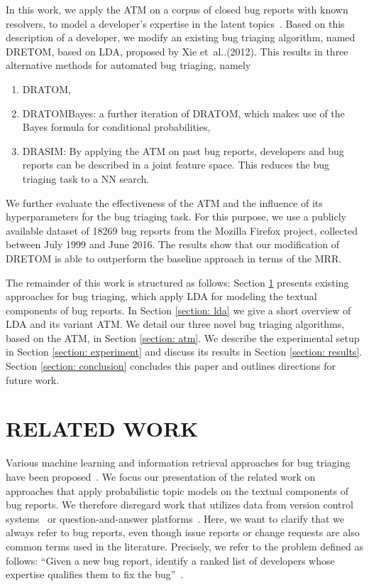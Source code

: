 \documentclass[a4paper,twoside]{article}
\makeatletter
\DeclareRobustCommand\onedot{\futurelet\@let@token\@onedot}
\def\@onedot{\ifx\@let@token.\else.\null\fi\xspace}
\def\etal{et~al\onedot}
\makeatother
\begin{document}
In this work, we apply the \ac{ATM} on a corpus of closed bug reports with known resolvers, to model a developer's expertise in the latent topics~\cite{rosen-zvi2004authors}.
Based on this description of a developer, we modify an existing bug triaging algorithm, named \ac{DRETOM}, based on \ac{LDA}, proposed by Xie \etal (2012).
This results in three alternative methods for automated bug triaging, namely
\begin{enumerate}
    \item \ac{DRATOM},
    \item \ac{DRATOMBayes}: a further iteration of \ac{DRATOM}, which makes use of the Bayes formula for conditional probabilities,
    \item \ac{DRASIM}: By applying the \ac{ATM} on past bug reports, developers and bug reports can be described in a joint feature space. This reduces the bug triaging task to a \ac{NN} search.
\end{enumerate}
We further evaluate the effectiveness of the \ac{ATM} and the influence of its hyperparameters for the bug triaging task.
For this purpose, we use a publicly available dataset of 18\thinspace{}269 bug reports from the Mozilla Firefox project, collected between July 1999 and June 2016.
The results show that our modification of \ac{DRETOM} is able to outperform the baseline approach in terms of the \ac{MRR}.

The remainder of this work is structured as follows:
Section \ref{section: related work} presents existing approaches for bug triaging, which apply \ac{LDA} for modeling the textual components of bug reports. 
In Section \ref{section: lda} we give a short overview of \ac{LDA} and its variant \ac{ATM}.
We detail our three novel bug triaging algorithms, based on the \ac{ATM}, in Section \ref{section: atm}.
We describe the experimental setup in Section \ref{section: experiment} and discuss its results in Section \ref{section: results}.
Section \ref{section: conclusion} concludes this paper and outlines directions for future work.

\section{\uppercase{Related Work}}
\label{section: related work}

Various machine learning and information retrieval approaches for bug triaging have been proposed~\cite{Sajedi-Badashian2020GuidelinesResearch}.
We focus our presentation of the related work on approaches that apply probabilistic topic models on the textual components of bug reports.
We therefore disregard work that utilizes data from version control systems~\cite{Matter2009AssigningDevelopers,Kagdi2012AssigningDevelopers,Shokripour2013WhyRecommendation,Khatun2016ADevelopers,Hu2014EffectiveInformation} or question-and-answer platforms~\cite{Sajedi-Badashian2015CrowdsourcedTriaging}. %
Here, we want to clarify that we always refer to bug reports, even though issue reports or change requests are also common terms used in the literature.
Precisely, we refer to the problem defined as follows:
\enquote{Given a new bug report, identify a ranked list of developers whose expertise qualifies them to fix the bug}~\cite{Sajedi-Badashian2020GuidelinesResearch}.
\end{document}
